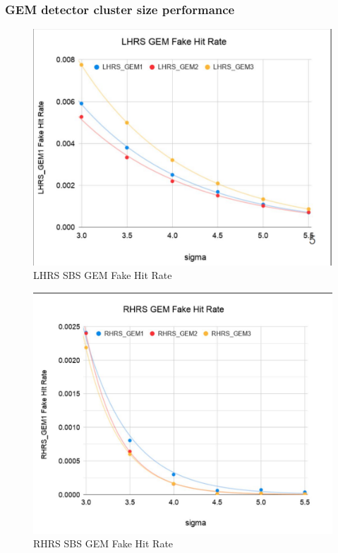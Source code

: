 \subsubsection{GEM detector cluster size performance}


\begin{figure}[!htbp]
    \centering
    \includegraphics[width=\textwidth]{images/chap5/lhrs_fake_hit_rate.png}
    \caption{LHRS SBS GEM Fake Hit Rate}
    \label{fig:lhrs_fake_hit_rate}
\end{figure}

\begin{figure}[!htbp]
    \centering
    \includegraphics[width=\textwidth]{images/chap5/rhrs_fake_hit_rate.png}
    \caption{RHRS SBS GEM Fake Hit Rate}
    \label{fig:rhrs_fake_hit_rate}
\end{figure}

